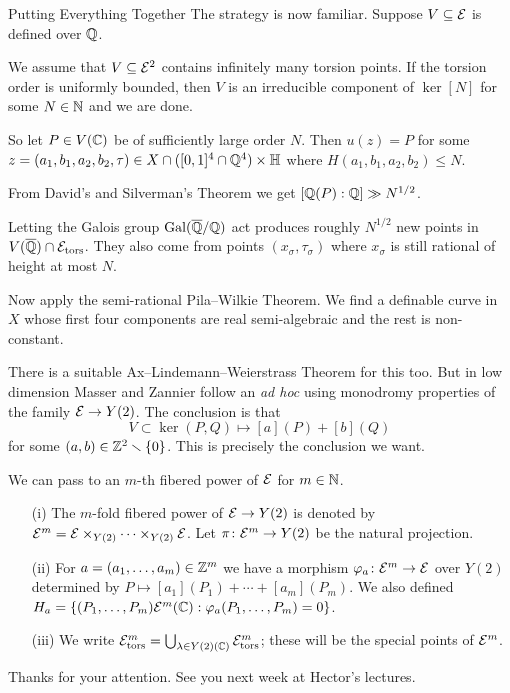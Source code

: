 \documentclass{beamer}
\begin{document}
\begin{frame}{Putting Everything Together}
  The strategy is now familiar. Suppose $V\subseteq{\mathcal E}$ is defined over
  ${\mathbb{Q}}$. 

  We assume that $V\subseteq{\mathcal E}^2$ contains infinitely many torsion points.
  If the torsion order is uniformly bounded, then $V$ is an irreducible
  component of $\ker[N]$ for some $N\in{\mathbb{N}}$ and we are done.  

  So let $P\in V({\mathbb{C}})$ be of sufficiently large order $N$. Then $u(z) = P$
  for some $z=(a_1,b_1,a_2,b_2,\tau)\in X\cap ([0,1]^4\cap{\mathbb{Q}}^4)\times {\mathbb{H}}$
  where $H(a_1,b_1,a_2,b_2)\le N$.

  From David's and Silverman's Theorem we get   $[{\mathbb{Q}}(P):{\mathbb{Q}}]\gg N^{1/2}$.

  Letting the Galois group $\mathrm{Gal}({\overline{\mathbb{Q}}}/{\mathbb{Q}})$ act produces
  roughly $N^{1/2}$ new points in $V({\overline{\mathbb{Q}}})\cap
  \mathcal{E}_{\mathrm{tors}}$. They also come from points
  $(x_\sigma,\tau_\sigma)$ where $x_\sigma$ is still rational of height
  at most $N$.
\end{frame}

\begin{frame}
  Now apply the \alert{semi-rational} Pila--Wilkie Theorem.
  We find a definable curve  in $X$ whose
  first four components are real semi-algebraic and the rest is
  non-constant.
  
  There is a suitable Ax--Lindemann--Weierstrass Theorem for this too.
  But in low dimension Masser and Zannier follow an \textit{ad hoc}
  using monodromy properties of the family ${\mathcal E}\rightarrow Y(2)$. The
  conclusion is that
  $$ V \subset \ker{(P,Q)\mapsto [a](P)+[b](Q)}$$
  for some
  $(a,b)\in{\mathbb{Z}}^2\smallsetminus\{0\}$. This is precisely the conclusion we want.
\end{frame}

\begin{frame}
  We can pass to an $m$-th fibered power of ${\mathcal E}$ for $m\in{\mathbb{N}}$. 
  \begin{definition}  
    \begin{enumerate}
    \item [(i)] The $m$-fold \alert{fibered power} of ${\mathcal E}\rightarrow Y(2)$
      is denoted by ${\mathcal E}^m = {\mathcal E}\times_{Y(2)}\cdots\times_{Y(2)}{\mathcal E}$.
      Let $\pi\colon{\mathcal E}^m\rightarrow Y(2)$ be the natural projection.
    \item[(ii)] For $a=(a_1,\ldots,a_m)\in{\mathbb{Z}}^m$ we have a morphism
      $\varphi_a \colon {\mathcal E}^m\rightarrow {\mathcal E}$ over $Y(2)$
      determined  by $P\mapsto
      [a_1](P_1)+\cdots +[a_m](P_m)$. We also defined $H_a =
      \{(P_1,\ldots,P_m) {\mathcal E}^m({\mathbb{C}}) : \varphi_a(P_1,\ldots,P_m)=0\}$. 
    \item[(iii)]  We write ${\mathcal E}^m_{\mathrm{tors}} = \bigcup_{\lambda\in Y(2)({\mathbb{C}})}
      {\mathcal E}^m_{\mathrm{tors}}$; these will be the \alert{special points} of ${\mathcal E}^m$.
    \end{enumerate}
  \end{definition}
\end{frame}

\begin{frame}
  
\end{frame}

\begin{frame}
  \begin{center}
    Thanks for your attention. See you next week at Hector's
    lectures. 
  \end{center}
\end{frame}
\end{document}
